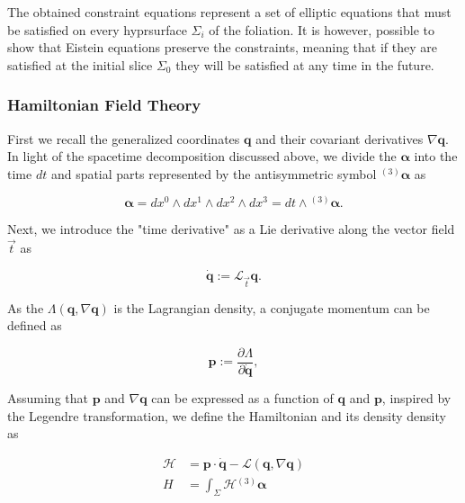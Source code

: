 \documentclass[11pt,a4paper,headinclude=true,DIV=14,BCOR=8mm,chapterprefix,listof=totoc,twoside,openright,abstracton]{scrbook}
\begin{document}
The obtained constraint equations represent a set of elliptic equations that must be satisfied on every hyprsurface $\Sigma_i$ of the foliation. It is however, possible to show that Eistein equations preserve the constraints, meaning that if they are satisfied at the initial slice $\Sigma_0$ they will be satisfied at any time in the future. 

\subsubsection{Hamiltonian Field Theory}

First we recall the generalized coordinates $\boldsymbol{q}$ and their covariant derivatives $\nabla\boldsymbol{q}$. \\
In light of the spacetime decomposition discussed above, we divide the $\boldsymbol{\alpha}$ into the time $dt$ and spatial parts represented by the antisymmetric symbol ${^{(3)}\boldsymbol{\alpha}}$ as 

\begin{equation}
    \boldsymbol{\alpha} = dx^0 \wedge dx^1 \wedge dx^2 \wedge dx^3 = dt \wedge {^{(3)}\boldsymbol{\alpha}}.
\end{equation}

Next, we introduce the "time derivative" as a Lie derivative along the vector field $\vec{t}$ as 

\begin{equation}
    \dot{\boldsymbol{q}} := \mathcal{L}_{\vec{t}}\boldsymbol{q}.
\end{equation}

As the $\Lambda(\boldsymbol{q}, \nabla\boldsymbol{q})$ is the Lagrangian density, a conjugate momentum can be defined as 

\begin{equation}
    \boldsymbol{p} := \frac{\partial\Lambda}{\partial\dot{\boldsymbol{q}}},
\end{equation}

Assuming that $\boldsymbol{p}$ and $\nabla\boldsymbol{q}$ can be expressed as a function of $\boldsymbol{q}$ and $\boldsymbol{p}$, inspired by the Legendre transformation, we define the Hamiltonian and its density density as

\begin{align}
    \mathcal{H} &= \boldsymbol{p}\cdot\dot{\boldsymbol{q}} - \mathcal{L}(\boldsymbol{q}, \nabla\boldsymbol{q}) \\
    H &= \int_{\Sigma}\mathcal{H}{^{(3)}\boldsymbol{\alpha}}
\end{align}
\end{document}
